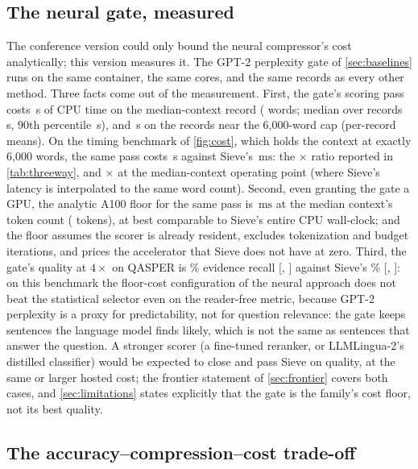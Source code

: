 \documentclass[preprint,12pt]{elsarticle}
\theoremstyle{remark}
\newcommand{\method}{Sieve}
\newcommand{\ms}{\ensuremath{\mathrm{ms}}}
\begin{document}
\subsection{The neural gate, measured}
\label{sec:gate}
The conference version could only bound the neural compressor's cost
analytically; this version measures it. The GPT-2 perplexity gate of
\autoref{sec:baselines} runs on the same container, the same cores,
and the same records as every other method. Three facts come out of
the measurement. First, the gate's scoring pass costs
\GateLatMedCtxS\,s of CPU time on the median-context record
(\GateMedWords{} words; median over records \GateLatMedS\,s, 90th
percentile \GateLatPnineS\,s), and \GateLatSixkS\,s on the
\GateSixkN{} records near the 6{,}000-word cap (per-record means). On
the timing benchmark of \autoref{fig:cost}, which holds the context
at exactly 6{,}000 words, the same pass costs \GateLatBenchSixkS\,s
against \method{}'s \TimeSieSixk\,\ms{}: the
\GateSieRatioSixk$\times$ ratio reported in \autoref{tab:threeway},
and \GateSieRatioMed$\times$ at the median-context operating point
(where \method{}'s latency is interpolated to the same word count).
Second, even granting
the gate a GPU, the analytic A100 floor for the same pass is
\GateAOneFloorMs\,\ms{} at the median context's token count
(\GateMedTok{} tokens), at best comparable to \method{}'s entire CPU
wall-clock; and the floor assumes the scorer is already resident,
excludes tokenization and budget iterations, and prices the accelerator
that \method{} does not have at zero. Third, the gate's quality at
$4\times$ on QASPER is \GateRecall\% evidence recall
[\GateRecallLo, \GateRecallHi] against \method{}'s \RecQSie\%
[\RecQSieLo, \RecQSieHi]: on this benchmark the floor-cost
configuration of the neural approach does not beat the statistical
selector even on the reader-free metric, because GPT-2 perplexity is
a proxy for predictability, not for question relevance: the gate keeps
sentences the language model finds likely, which is not the same as
sentences that answer the question. A stronger scorer (a fine-tuned
reranker, or LLMLingua-2's distilled classifier) would be expected to
close and pass \method{} on quality, at the same or larger hosted
cost; the frontier statement of \autoref{sec:frontier} covers both
cases, and \autoref{sec:limitations} states explicitly that the gate
is the family's cost floor, not its best quality.

\subsection{The accuracy--compression--cost trade-off}
\label{sec:threeway}
\end{document}
